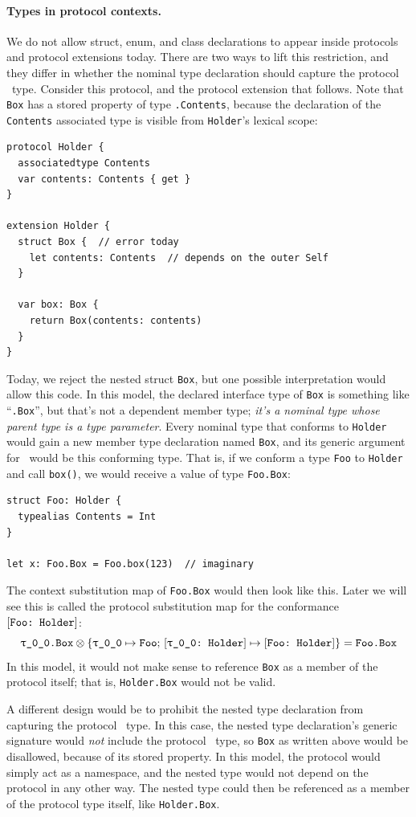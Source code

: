 \documentclass[../generics]{subfiles}
\begin{document}
\paragraph{Types in protocol contexts.} We do not allow struct, enum, and class declarations to appear inside protocols and protocol extensions today. There are two ways to lift this restriction, and they differ in whether the nominal type declaration should capture the \IndexSelf protocol \tSelf\ type. Consider this protocol, and the protocol extension that follows. Note that \texttt{Box} has a stored property of type \texttt{\rT.Contents}, because the declaration of the \texttt{Contents} associated type is visible from \texttt{Holder}'s lexical scope:
\begin{Verbatim}
protocol Holder {
  associatedtype Contents
  var contents: Contents { get }
}

extension Holder {
  struct Box {  // error today
    let contents: Contents  // depends on the outer Self
  }

  var box: Box {
    return Box(contents: contents)
  }
}
\end{Verbatim}
Today, we reject the nested struct \texttt{Box}, but one possible interpretation would allow this code. In this model, the declared interface type of \texttt{Box} is something like ``\texttt{\rT.Box}'', but that's not a dependent member type; \textsl{it's a nominal type whose parent type is a type parameter}. Every nominal type that conforms to \texttt{Holder} would gain a new member type declaration named \texttt{Box}, and its generic argument for \tSelf\ would be this conforming type. That is, if we conform a type \texttt{Foo} to \texttt{Holder} and call \texttt{box()}, we would receive a value of type \texttt{Foo.Box}:
\begin{Verbatim}
struct Foo: Holder {
  typealias Contents = Int
}

let x: Foo.Box = Foo.box(123)  // imaginary
\end{Verbatim}
The context substitution map of \texttt{Foo.Box} would then look like this. Later we will see this is called the protocol substitution map for the conformance $[\texttt{Foo:~Holder}]$:
\[
\texttt{\rT.Box} \otimes \SubstMapC{\SubstType{\rT}{Foo}}{\SubstConf{\rT}{Foo}{Holder}} = \texttt{Foo.Box}
\]
In this model, it would not make sense to reference \texttt{Box} as a member of the protocol itself; that is, \texttt{Holder.Box} would not be valid.

A different design would be to prohibit the nested type declaration from capturing the protocol \tSelf\ type. In this case, the nested type declaration's generic signature would \emph{not} include the protocol \tSelf\ type, so \texttt{Box} as written above would be disallowed, because of its stored property. In this model, the protocol would simply act as a namespace, and the nested type would not depend on the protocol in any other way. The nested type could then be referenced as a member of the protocol type itself, like \texttt{Holder.Box}.
\end{document}

